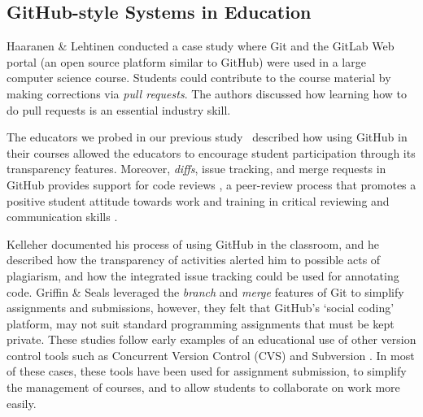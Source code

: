 \subsection{GitHub-style Systems in Education}
Haaranen \& Lehtinen \cite{haaranen2015teaching} conducted a case study where Git and the GitLab Web portal (an open source platform similar to GitHub) were used in a large computer science course.  Students could contribute to the course material by making corrections via \emph{pull requests}.  The authors discussed how learning how to do pull requests is an essential industry skill.   

 The educators we probed in our previous study~\cite{zagalsky2015emergence} described how using GitHub in their courses allowed the educators to encourage student participation through its transparency features. Moreover, \emph{diffs}, issue tracking, and merge requests in GitHub provides support for code reviews \cite{kalliamvakou2014promises}, a peer-review process that promotes a positive student attitude towards work and training in critical reviewing and communication skills \cite{hundhausen2013talking}.

Kelleher \cite{kelleher2014employing} documented his process of using GitHub in the classroom, and he described how the transparency of activities alerted him to possible acts of plagiarism, and how the integrated issue tracking could be used for annotating code. Griffin \& Seals \cite{griffin2013github} leveraged the \emph{branch} and \emph{merge} features of Git to simplify assignments and submissions, however, they felt that GitHub's `social coding' platform, may not suit standard programming assignments that must be kept private. These studies follow early examples of an educational use of other version control tools such as Concurrent Version Control (CVS) \cite{reid2005learning} and Subversion \cite{clifton2007subverting}. In most of these cases, these tools have been used for assignment submission, to simplify the management of courses, and to allow students to collaborate on work more easily. %

